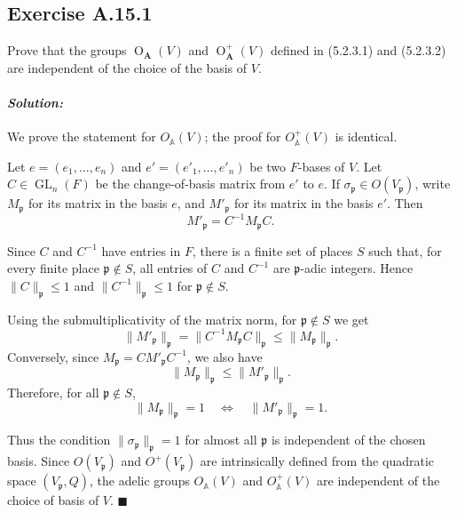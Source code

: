 \documentclass[12pt, a4paper]{article}
\newenvironment{solution}
  {\paragraph{\textit{Solution:}}\par\medskip}
  {\hfill$\blacksquare$\vspace{0.1cm}}
\begin{document}
\subsection*{Exercise A.15.1}
Prove that the groups $\operatorname{O}_{\mathbf{A}}(V)$ and $\operatorname{O}_{\mathbf{A}}^+(V)$ defined in (5.2.3.1) and (5.2.3.2) are independent of the choice of the basis of $V$.
\begin{solution}
We prove the statement for \(O_{\mathbb A}(V)\); the proof for
\(O_{\mathbb A}^{+}(V)\) is identical.

Let \(e=(e_1,\dots,e_n)\) and \(e'=(e'_1,\dots,e'_n)\) be two \(F\)-bases of
\(V\). Let \(C\in \operatorname{GL}_n(F)\) be the change-of-basis matrix from
\(e'\) to \(e\). If \(\sigma_{\mathfrak p}\in O(V_{\mathfrak p})\), write
\(M_{\mathfrak p}\) for its matrix in the basis \(e\), and
\(M'_{\mathfrak p}\) for its matrix in the basis \(e'\). Then
\[
M'_{\mathfrak p}=C^{-1}M_{\mathfrak p}C .
\]

Since \(C\) and \(C^{-1}\) have entries in \(F\), there is a finite set of
places \(S\) such that, for every finite place \(\mathfrak p\notin S\), all
entries of \(C\) and \(C^{-1}\) are \(\mathfrak p\)-adic integers. Hence
\(\|C\|_{\mathfrak p}\le 1\) and \(\|C^{-1}\|_{\mathfrak p}\le 1\) for
\(\mathfrak p\notin S\).

Using the submultiplicativity of the matrix norm, for
\(\mathfrak p\notin S\) we get
\[
\|M'_{\mathfrak p}\|_{\mathfrak p}
=\|C^{-1}M_{\mathfrak p}C\|_{\mathfrak p}
\le \|M_{\mathfrak p}\|_{\mathfrak p}.
\]
Conversely, since \(M_{\mathfrak p}=CM'_{\mathfrak p}C^{-1}\), we also have
\[
\|M_{\mathfrak p}\|_{\mathfrak p}
\le \|M'_{\mathfrak p}\|_{\mathfrak p}.
\]
Therefore, for all \(\mathfrak p\notin S\),
\[
\|M_{\mathfrak p}\|_{\mathfrak p}=1
\quad\Longleftrightarrow\quad
\|M'_{\mathfrak p}\|_{\mathfrak p}=1 .
\]

Thus the condition \(\|\sigma_{\mathfrak p}\|_{\mathfrak p}=1\) for almost all
\(\mathfrak p\) is independent of the chosen basis. Since \(O(V_{\mathfrak p})\)
and \(O^{+}(V_{\mathfrak p})\) are intrinsically defined from the quadratic
space \((V_{\mathfrak p},Q)\), the adelic groups
\(O_{\mathbb A}(V)\) and \(O_{\mathbb A}^{+}(V)\) are independent of the choice
of basis of \(V\).
\end{solution}
\end{document}
